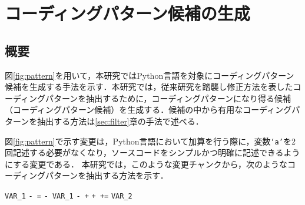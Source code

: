 \documentclass[11pt]{jreport}
\begin{document}


\chapter{コーディングパターン候補の生成}\label{sec:pattern}
\section{概要}
図\ref{fig:pattern}を用いて，本研究ではPython言語を対象にコーディングパターン候補を生成する手法を示す．本研究では，従来研究を踏襲し修正方法を表したコーディングパターンを抽出するために，コーディングパターンになり得る候補（コーディングパターン候補）を生成する．候補の中から有用なコーディングパターンを抽出する方法は\ref{sec:filter}章の手法で述べる．

図\ref{fig:pattern}で示す変更は，Python言語において加算を行う際に，変数\texttt{`a'}を2回記述する必要がなくなり，ソースコードをシンプルかつ明確に記述できるようにする変更である．
本研究では，このような変更チャンクから，次のようなコーディングパターンを抽出する方法を示す．

\colorbox{lightgray!50}{\texttt{VAR\_1}} \colorbox{lightgray!50}{\texttt{- =}} \colorbox{lightgray!50}{\texttt{- VAR\_1}} \colorbox{lightgray!50}{\texttt{- +}} \colorbox{lightgray!50}{\texttt{+ +=}} \colorbox{lightgray!50}{\texttt{VAR\_2}}
\end{document}
